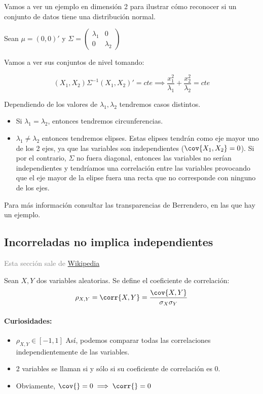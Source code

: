 \begin{example}
Vamos a ver un ejemplo en dimensión 2 para ilustrar cómo reconocer si un conjunto de datos tiene una distribución normal.

Sean $μ = (0,0)'$ y $Σ = \begin{pmatrix} λ_1 & 0 \\ 0 & λ_2 \end{pmatrix}$

Vamos a ver sus conjuntos de nivel tomando:

\[(X_1,X_2) Σ^{-1} (X_1,X_2)' = cte \implies \frac{x_1^2}{λ_1} + \frac{x_2^2}{λ_2} = cte\]


Dependiendo de los valores de $λ_1,λ_2$ tendremos casos distintos.

\begin{itemize}
	\item Si $λ_1 = λ_2$, entonces tendremos circunferencias.
	\item $λ_1 ≠ λ_2$ entonces tendremos elipses.
	\subitem
	Estas elipses tendrán como eje mayor uno de los 2 ejes, ya que las variables son independientes ($\cov{X_1,X_2} = 0$).
	\subitem Si por el contrario, $Σ$ no fuera diagonal, entonces las variables no serían independientes y tendríamos una correlación entre las variables provocando que el eje mayor de la elipse fuera una recta que no corresponde con ninguno de los ejes.
\end{itemize}


Para más información consultar las transparencias de Berrendero, en las que hay un ejemplo.

\end{example}


\subsection{Incorreladas no implica independientes}
\label{sec:incorrnotindep}
\textcolor{gray}{Esta sección sale de \href{https://en.wikipedia.org/wiki/Normally_distributed_and_uncorrelated_does_not_imply_independent}{Wikipedia}}


\begin{defn}[Correlación]
Sean $X,Y$ dos variables aleatorias. Se define el coeficiente de correlación:
\[\rho_{X,Y}=\corr{X,Y}={\cov{X,Y} \over \sigma_X \sigma_Y}\]

\paragraph{Curiosidades:}

\begin{itemize}
	\item $\rho_{X,Y} ∈ [-1,1]$ Así, podemos comparar todas las correlaciones independientemente de las variables.
	\item 2 variables se llaman  si y sólo si su coeficiente de correlación es $0$.
	\item Obviamente, $\cov{} = 0 \implies \corr{} = 0$
\end{itemize}
\end{defn}


